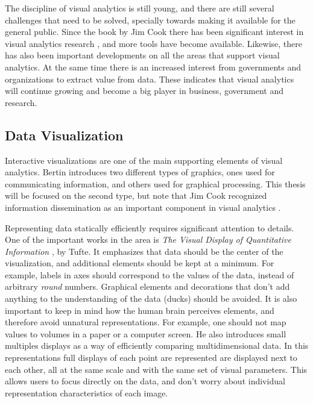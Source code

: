 The discipline of visual analytics is still young, and there are still several challenges that need to be solved, specially towards making it available for the general public\autocite{kwon_visual_2011}. Since the book by Jim Cook there has been significant interest in visual analytics research \autocite{chen_illuminated_2012}, and more tools have become available. Likewise, there has also been important developments on all the areas that support visual analytics. At the same time there is an increased interest from governments and organizations to extract value from data. These indicates that visual analytics will continue growing and become a big player in business, government and research.


\subsection{Data Visualization}

Interactive visualizations are one of the main supporting elements of visual analytics. Bertin 
\autocite{bertin_graphics_1981} introduces two different types of graphics, ones used for communicating information, and others used for graphical processing. This thesis will be focused on the second type, but note that Jim Cook recognized information dissemination as an important component in visual analytics \autocite{cook_illuminating_2005}.


Representing data statically efficiently requires significant attention to details. One of the important works in the area is \emph{The Visual Display of Quantitative Information} \autocite{tufte_visual_1983} , by Tufte. It emphasizes that data should be the center of the visualization, and additional elements should be kept at a minimum. For example, labels in axes should correspond to the values of the data, instead of arbitrary \emph{round} numbers. Graphical elements and decorations that don't add anything to the understanding of the data (ducks) should be avoided. It is also important to keep in mind how the human brain perceives elements, and therefore avoid unnatural representations. For example, one should not map values to volumes in a paper or a computer screen. He also introduces small multiples displays as a way of efficiently comparing multidimensional data. In this representations full displays of each point are represented are displayed next to each other, all at the same scale and with the same set of visual parameters. This allows users to focus directly on the data, and don't worry about individual representation characteristics of each image.

